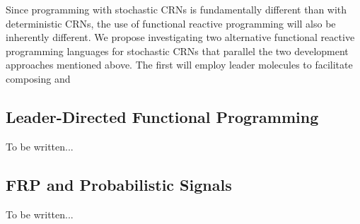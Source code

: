 Since programming with stochastic CRNs is fundamentally different than with deterministic CRNs, the use of functional reactive programming will also be inherently different.
We propose investigating two alternative functional reactive programming languages for stochastic CRNs that parallel the two development approaches mentioned above.
The first will employ leader molecules to facilitate composing and 

%

\subsection{Leader-Directed Functional Programming}

To be written...

%

\subsection{FRP and Probabilistic Signals}

To be written...

